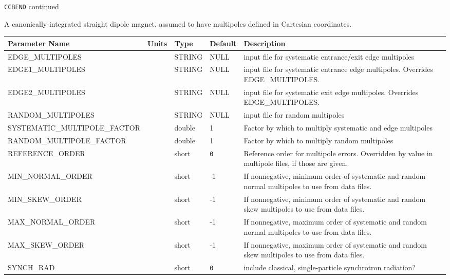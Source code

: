 \newpage
\begin{center}{\Large\verb|CCBEND| continued}\end{center}
A canonically-integrated straight dipole magnet, assumed to have multipoles defined in Cartesian coordinates.
\\
\begin{tabular}{|l|l|l|l|p{\descwidth}|} \hline
Parameter Name & Units & Type & Default & Description \\ \hline 
EDGE\_MULTIPOLES &  & STRING &   NULL            & input file for systematic entrance/exit edge multipoles  \\ \hline 
EDGE1\_MULTIPOLES &  & STRING &   NULL            & input file for systematic entrance edge multipoles. Overrides EDGE\_MULTIPOLES.  \\ \hline 
EDGE2\_MULTIPOLES &  & STRING &   NULL            & input file for systematic exit edge multipoles. Overrides EDGE\_MULTIPOLES.  \\ \hline 
RANDOM\_MULTIPOLES &  & STRING &   NULL            & input file for random multipoles  \\ \hline 
SYSTEMATIC\_MULTIPOLE\_FACTOR &  & double &   1 & Factor by which to multiply systematic and edge multipoles  \\ \hline 
RANDOM\_MULTIPOLE\_FACTOR &  & double &   1 & Factor by which to multiply random multipoles  \\ \hline 
REFERENCE\_ORDER &  & short &  \verb|0| & Reference order for multipole errors. Overridden by value in multipole files, if those are given.  \\ \hline 
MIN\_NORMAL\_ORDER &  & short &   -1              & If nonnegative, minimum order of systematic and random normal multipoles to use from data files.  \\ \hline 
MIN\_SKEW\_ORDER &  & short &   -1              & If nonnegative, minimum order of systematic and random skew multipoles to use from data files.  \\ \hline 
MAX\_NORMAL\_ORDER &  & short &   -1              & If nonnegative, maximum order of systematic and random normal multipoles to use from data files.  \\ \hline 
MAX\_SKEW\_ORDER &  & short &   -1              & If nonnegative, maximum order of systematic and random skew multipoles to use from data files.  \\ \hline 
SYNCH\_RAD &  & short &  \verb|0| & include classical, single-particle synchrotron radiation?  \\ \hline 
\end{tabular}

